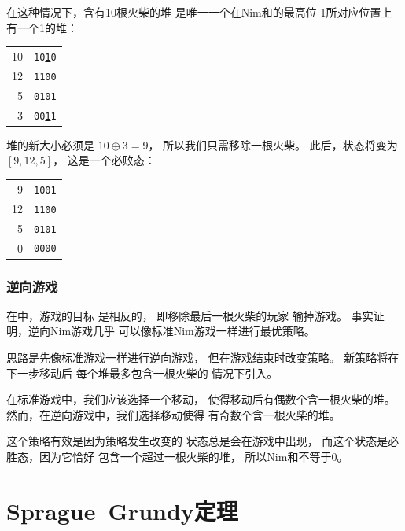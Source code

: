 在这种情况下，含有10根火柴的堆
是唯一一个在Nim和的最高位
1所对应位置上有一个1的堆：

\begin{center}
\begin{tabular}{r|r}
10 & \texttt{10\underline{1}0} \\
12 & \texttt{1100} \\
5 & \texttt{0101} \\
\hline
3 & \texttt{00\underline{1}1} \\
\end{tabular}
\end{center}

堆的新大小必须是
$10 \oplus 3 = 9$，
所以我们只需移除一根火柴。
此后，状态将变为 $[9,12,5]$，
这是一个必败态：

\begin{center}
\begin{tabular}{r|r}
9 & \texttt{1001} \\
12 & \texttt{1100} \\
5 & \texttt{0101} \\
\hline
0 & \texttt{0000} \\
\end{tabular}
\end{center}

\subsubsection{逆向游戏}


在中，游戏的目标
是相反的，
即移除最后一根火柴的玩家
输掉游戏。
事实证明，逆向Nim游戏几乎
可以像标准Nim游戏一样进行最优策略。

思路是先像标准游戏一样进行逆向游戏，
但在游戏结束时改变策略。
新策略将在下一步移动后
每个堆最多包含一根火柴的
情况下引入。

在标准游戏中，我们应该选择一个移动，
使得移动后有偶数个含一根火柴的堆。
然而，在逆向游戏中，我们选择移动使得
有奇数个含一根火柴的堆。

这个策略有效是因为策略发生改变的
状态总是会在游戏中出现，
而这个状态是必胜态，因为它恰好
包含一个超过一根火柴的堆，
所以Nim和不等于0。

\section{Sprague–Grundy定理}


